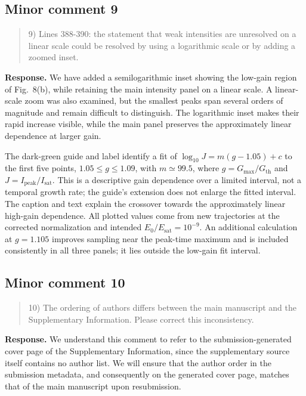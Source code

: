 \documentclass[11pt,a4paper]{article}
\newcommand{\reviewercomment}[1]{\begin{quote}\small #1\end{quote}}
\newcommand{\response}[1]{\par\textbf{Response.} #1\par}
\begin{document}
\subsection*{Minor comment 9}
\label{r1-minor-9}
\reviewercomment{
9) Lines 388-390: the statement that weak intensities are unresolved on a linear scale could be resolved by using a logarithmic scale or by adding a zoomed inset.
}
\response{We have added a semilogarithmic inset showing the low-gain region of Fig.~8(b), while retaining the main intensity panel on a linear scale. A linear-scale zoom was also examined, but the smallest peaks span several orders of magnitude and remain difficult to distinguish. The logarithmic inset makes their rapid increase visible, while the main panel preserves the approximately linear dependence at larger gain.

The dark-green guide and label identify a fit of $\log_{10}J=m(g-1.05)+c$ to the first five points, $1.05\leq g\leq1.09$, with $m\simeq99.5$, where $g=G_{\max}/G_{\mathrm{th}}$ and $J=I_{\mathrm{peak}}/I_{\mathrm{sat}}$. This is a descriptive gain dependence over a limited interval, not a temporal growth rate; the guide's extension does not enlarge the fitted interval. The caption and text explain the crossover towards the approximately linear high-gain dependence. All plotted values come from new trajectories at the corrected normalization and intended $E_0/E_{\mathrm{sat}}=10^{-9}$. An additional calculation at $g=1.105$ improves sampling near the peak-time maximum and is included consistently in all three panels; it lies outside the low-gain fit interval.}

\subsection*{Minor comment 10}
\label{r1-minor-10}
\reviewercomment{
10) The ordering of authors differs between the main manuscript and the Supplementary Information. Please correct this inconsistency.
}
\response{We understand this comment to refer to the submission-generated cover page of the Supplementary Information, since the supplementary source itself contains no author list. We will ensure that the author order in the submission metadata, and consequently on the generated cover page, matches that of the main manuscript upon resubmission.}
\end{document}
